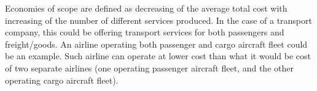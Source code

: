 \par
Economies of scope are defined as decreasing of the average total cost with increasing of the number of different services produced. In the case of a transport company, this could be offering transport services for both passengers and freight/goods. An airline operating both passenger and cargo aircraft fleet could be an example. Such airline can operate at lower cost than what it would be cost of two separate airlines (one operating passenger aircraft fleet, and the other operating cargo aircraft fleet).
